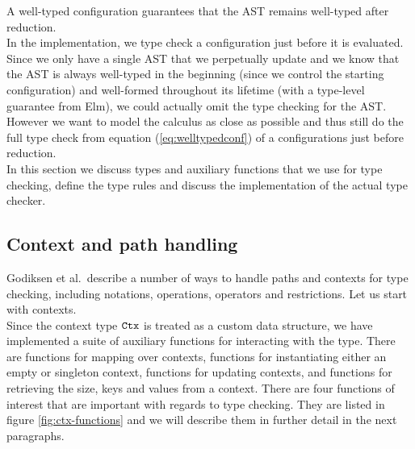 A well-typed configuration guarantees that the AST remains well-typed after
reduction. \\

In the implementation, we type check a configuration just before it is
evaluated. Since we only have a single AST that we perpetually update and we
know that the AST is always well-typed in the beginning (since we control the
starting configuration) and well-formed throughout its lifetime (with a
type-level guarantee from Elm), we could actually omit the type checking for
the AST. However we want to model the calculus as close as possible and thus
still do the full type check from equation (\ref{eq:welltypedconf}) of a
configurations just before reduction.\\

In this section we discuss types and auxiliary functions that we use for type
checking, define the type rules and discuss the implementation of the actual
type checker.

\subsection{Context and path handling}
Godiksen et al.\pepm~describe a number of ways to handle paths and contexts for
type checking, including notations, operations, operators and restrictions.
Let us start with contexts.\\

Since the context type $\texttt{Ctx}$ is treated as a custom data structure, we
have implemented a suite of auxiliary functions for interacting with the type.
There are functions for mapping over contexts, functions for instantiating
either an empty or singleton context, functions for updating contexts, and
functions for retrieving the size, keys and values from a context. There are
four functions of interest that are important with regards to type checking.
They are listed in figure \ref{fig:ctx-functions} and we will describe them in
further detail in the next paragraphs.

